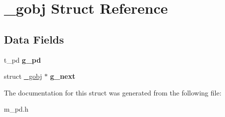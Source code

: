 \hypertarget{struct__gobj}{}\section{\+\_\+gobj Struct Reference}
\label{struct__gobj}
\subsection*{Data Fields}
\begin{DoxyCompactItemize}
\item 
\mbox{\label{struct__gobj_aeb4882e0afbd07827beea5cb2024b4ac}} 
t\+\_\+pd {\bfseries g\+\_\+pd}
\item 
\mbox{\label{struct__gobj_abb00f331d612607d8138bd9a750c1e2f}} 
struct \hyperlink{struct__gobj}{\+\_\+gobj} $\ast$ {\bfseries g\+\_\+next}
\end{DoxyCompactItemize}


The documentation for this struct was generated from the following file\+:\begin{DoxyCompactItemize}
\item 
m\+\_\+pd.\+h\end{DoxyCompactItemize}

